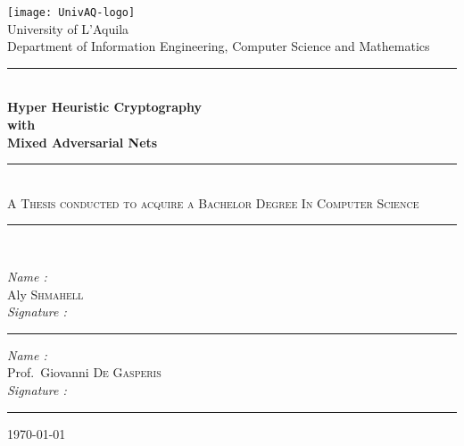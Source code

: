 \documentclass[a4paper, 12pt]{report}
\newcommand\tab[1][1cm]{\hspace*{#1}}
\begin{document}
\begin{titlepage}
	\begin{center}
		\texttt{[image: UnivAQ-logo]}\\[1cm]
		{\LARGE University of L'Aquila}\\[0.5cm]
		{\large Department of Information Engineering, Computer Science and Mathematics}\\[0.5cm]
		\rule{\linewidth}{0.5mm} \\[0.4cm]
		{\huge \bfseries Hyper Heuristic Cryptography\\
			with\\
			Mixed Adversarial Nets \\[0.4cm] }
		\rule{\linewidth}{0.5mm} \\[0.1cm]
		\noindent
		{\large  \textsc{A Thesis conducted to acquire a Bachelor Degree In Computer Science}
			\vspace{-0.04cm} \\[0.01cm] }
		\rule{\linewidth}{0.5mm} \\[0.1cm]
		\noindent
			\begin{tcbraster}[raster columns=2,raster rows=1,
				enhanced,size=small,fit algorithm=hybrid* ]
					\begin{tcolorbox}[
						colback=white,
						sharp corners = northwest,
						title={Author}
						]
							\large
							\emph{Name :} \\[0.2cm]
							\tab Aly \textsc{Shmahell}\\[0.6cm]
							\emph{Signature :}\\[0.6cm]
							\rule{\linewidth}{0.5mm}
					\end{tcolorbox}
					\begin{tcolorbox}[
						colback=white,
						sharp corners = northwest,
						title = {Supervisor}
						]
							\large
							\emph{Name :} \\[0.2cm]
							\tab Prof.~Giovanni \textsc{De Gasperis}\\[0.6cm]
							\emph{Signature :}\\[0.6cm]
							\rule{\linewidth}{0.5mm}
					\end{tcolorbox}
			\end{tcbraster}
			\vspace{0.1cm}
		\today
	\end{center}
\end{titlepage}
\end{document}

